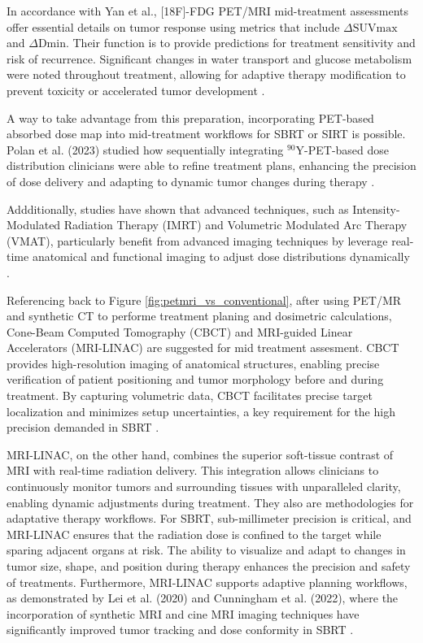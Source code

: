 \documentclass[11pt]{article} %
\begin{document}
\begin{multicols}{2}
In accordance with Yan et al., [18F]-FDG PET/MRI mid-treatment assessments offer essential details on tumor response using metrics that include $\Delta \text{SUVmax}$ and $\Delta \text{Dmin}$. Their function is to provide predictions for treatment sensitivity and risk of recurrence. Significant changes in water transport and glucose metabolism were noted throughout treatment, allowing for adaptive therapy modification to prevent toxicity or accelerated tumor development \cite{yan2024}.  

A way to take advantage from this preparation, incorporating PET-based absorbed dose map into mid-treatment workflows for SBRT or SIRT is possible. Polan et al. (2023) studied how sequentially integrating $^{90}\text{Y}$-PET-based dose distribution clinicians were able to refine treatment plans, enhancing the precision of dose delivery and adapting to dynamic tumor changes during therapy \cite{Polan2023}. 

Addditionally, studies have shown that  advanced techniques, such as Intensity-Modulated Radiation Therapy (IMRT) and Volumetric Modulated Arc Therapy (VMAT), particularly benefit from advanced imaging techniques by leverage real-time anatomical and functional imaging to adjust dose distributions dynamically \cite{Hunte2022,Tsang2016}.

Referencing back to Figure \ref{fig:petmri_vs_conventional}, after using PET/MR and synthetic CT to performe treatment planing and dosimetric calculations, Cone-Beam Computed Tomography (CBCT) and MRI-guided Linear Accelerators (MRI-LINAC) are suggested for mid treatment assesment. CBCT provides high-resolution imaging of anatomical structures, enabling precise verification of patient positioning and tumor morphology before and during treatment. By capturing volumetric data, CBCT facilitates precise target localization and minimizes setup uncertainties, a key requirement for the high precision demanded in SBRT \cite{Srinivasan2014}.

MRI-LINAC, on the other hand, combines the superior soft-tissue contrast of MRI with real-time radiation delivery. This integration allows clinicians to continuously monitor tumors and surrounding tissues with unparalleled clarity, enabling dynamic adjustments during treatment. They also are methodologies for adaptative therapy workflows. For SBRT, sub-millimeter precision is critical,  and MRI-LINAC ensures that the radiation dose is confined to the target while sparing adjacent organs at risk. The ability to visualize and adapt to changes in tumor size, shape, and position during therapy enhances the precision and safety of treatments. Furthermore, MRI-LINAC supports adaptive planning workflows, as demonstrated by Lei et al. (2020) and Cunningham et al. (2022), where the incorporation of synthetic MRI and cine MRI imaging techniques have significantly improved tumor tracking and dose conformity in SBRT \cite{Lei2020,Cunningham2022}.


\end{multicols}
\end{document}
